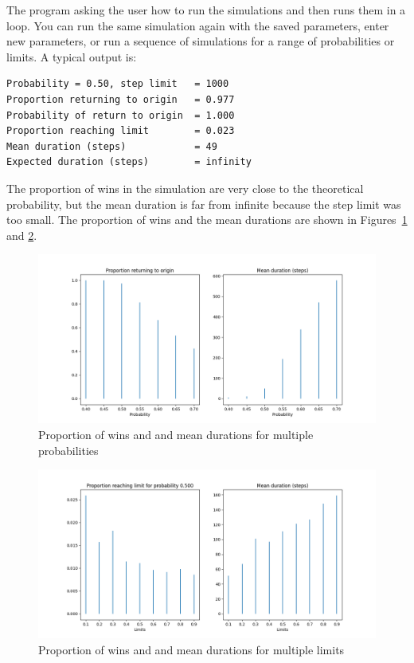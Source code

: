 The program asking the user how to run the simulations and then runs them in a loop. You can run the same simulation again with the saved parameters, enter new parameters, or run a sequence of simulations for a range of probabilities or limits. A typical output is:
\begin{verbatim}
Probability = 0.50, step limit   = 1000
Proportion returning to origin   = 0.977
Probability of return to origin  = 1.000
Proportion reaching limit        = 0.023
Mean duration (steps)            = 49
Expected duration (steps)        = infinity
\end{verbatim}
The proportion of wins in the simulation are very close to the theoretical probability, but the mean duration is far from infinite because the step limit was too small.  The proportion of wins and the mean durations are shown in Figures~\ref{f.random_walk-01} and \ref{f.random_walk-02}.
\begin{figure}
\begin{center}
\includegraphics[width=\textwidth]{random_walk-01}
\caption{Proportion of wins and and mean durations for multiple probabilities}\label{f.random_walk-01}
\end{center}
\end{figure}
\begin{figure}
\begin{center}
\includegraphics[width=\textwidth]{random_walk-02}
\caption{Proportion of wins and and mean durations for multiple limits}\label{f.random_walk-02}
\end{center}
\end{figure}
